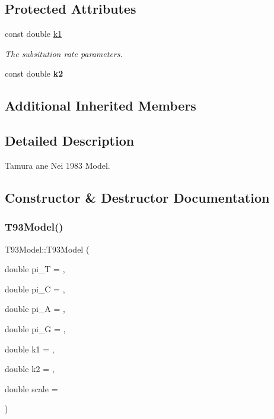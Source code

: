 \subsection*{Protected Attributes}
\textbf{ }\par
\begin{DoxyCompactItemize}
\item 
const double \hyperlink{classretrocombinator_1_1T93Model_a6844211aebb1deb555fa6f9b11b9d395}{k1}
\begin{DoxyCompactList}\small\item\em The subsitution rate parameters. \end{DoxyCompactList}\item 
\mbox{\label{classretrocombinator_1_1T93Model_a257785c2de239621e359051e0a1db30a}} 
const double {\bfseries k2}
\end{DoxyCompactItemize}

\subsection*{Additional Inherited Members}


\subsection{Detailed Description}
Tamura ane Nei 1983 Model. 

\subsection{Constructor \& Destructor Documentation}
\mbox{\label{classretrocombinator_1_1T93Model_ad857daf369e1d16fc8233b08dc0deef8}} 
\subsubsection{\texorpdfstring{T93\+Model()}{T93Model()}}
{\footnotesize\ttfamily T93\+Model\+::\+T93\+Model (\begin{DoxyParamCaption}\item[{double}]{pi\+\_\+T = {},  }\item[{double}]{pi\+\_\+C = {},  }\item[{double}]{pi\+\_\+A = {},  }\item[{double}]{pi\+\_\+G = {},  }\item[{double}]{k1 = {},  }\item[{double}]{k2 = {},  }\item[{double}]{scale = {} }\end{DoxyParamCaption})}



